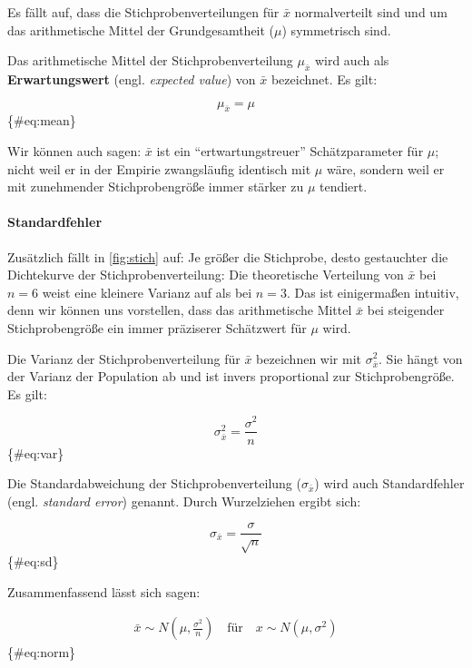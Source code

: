 \documentclass[
  ngerman,
]{article}
\begin{document}
Es fällt auf, dass die Stichprobenverteilungen für \(\bar{x}\) normalverteilt sind und um das arithmetische Mittel der Grundgesamtheit (\(\mu\)) symmetrisch sind.

Das arithmetische Mittel der Stichprobenverteilung \(\mu_{\bar{x}}\) wird auch als \textbf{Erwartungswert} (engl. \emph{expected value}) von \(\bar{x}\) bezeichnet. Es gilt:

\nopagebreak

\[
\mu_{\bar{x}} = \mu
\]\{\#eq:mean\}

Wir können auch sagen: \(\bar{x}\) ist ein ``ertwartungstreuer'' Schätzparameter für \(\mu\); nicht weil er in der Empirie zwangsläufig identisch mit \(\mu\) wäre, sondern weil er mit zunehmender Stichprobengröße immer stärker zu \(\mu\) tendiert.

\hypertarget{standardfehler}{%
\paragraph{Standardfehler}\label{standardfehler}}

Zusätzlich fällt in \autoref{fig:stich} auf: Je größer die Stichprobe, desto gestauchter die Dichtekurve der Stichprobenverteilung: Die theoretische Verteilung von \(\bar{x}\) bei \(n=6\) weist eine kleinere Varianz auf als bei \(n=3\). Das ist einigermaßen intuitiv, denn wir können uns vorstellen, dass das arithmetische Mittel \(\bar{x}\) bei steigender Stichprobengröße ein immer präziserer Schätzwert für \(\mu\) wird.

Die Varianz der Stichprobenverteilung für \(\bar{x}\) bezeichnen wir mit \(\sigma^2_{\bar{x}}\). Sie hängt von der Varianz der Population ab und ist invers proportional zur Stichprobengröße. Es gilt:

\nopagebreak

\[
\sigma^2_{\bar{x}} = \frac{\sigma^2}{n}
\] \{\#eq:var\}

Die Standardabweichung der Stichprobenverteilung (\(\sigma_{\bar{x}}\)) wird auch Standardfehler (engl. \emph{standard error}) genannt. Durch Wurzelziehen ergibt sich:

\nopagebreak

\[
\sigma_{\bar{x}} = \frac{\sigma}{\sqrt{n}}
\]\{\#eq:sd\}

Zusammenfassend lässt sich sagen:

\nopagebreak

\[\begin{aligned}
\bar{x} \sim N(\mu, {\textstyle \frac{\sigma^2}{n}}) \quad \textrm{für} \quad x\sim N(\mu, \sigma^2)
\end{aligned}\]\{\#eq:norm\}
\end{document}
